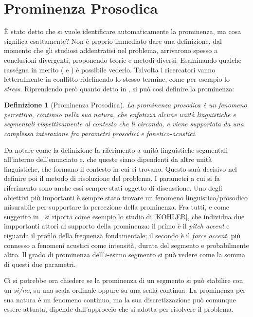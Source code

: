 \documentclass[twoside,twocolumn,11pt]{extarticle}
\theoremstyle{definition}
\begin{document}
\section{Prominenza Prosodica}\label{sec:prom}
	È stato detto che si vuole identificare automaticamente la prominenza, ma cosa significa esattamente? Non è proprio immediato dare una definizione, dal momento che gli studiosi addentratisi nel problema, arrivarono spesso a conclusioni divergenti, proponendo teorie e metodi diversi. Esaminando qualche rasségna in merito (\cite[Capitolo 1]{bib:fenomeni-prosodici-prominenza} e \cite{bib:prominence-by-acoustic-analyses}) è possibile vederlo. Talvolta i ricercatori vanno letteralmente in conflitto ridefinendo lo stesso termine, come per esempio lo \textit{stress}. Riprendendo però quanto detto in \cite{bib:prominence-by-acoustic-analyses}, si può così definire la prominenza:
	\theoremstyle{plain}
	\newtheorem{definition}{Definizione}
	\begin{definition}[Prominenza Prosodica]\label{def:prosodic-prominency}
		La prominenza prosodica è un fenomeno percettivo, continuo nella sua natura, che enfatizza alcune unità linguistiche e segmentali rispettivamente al contesto che li circonda, e viene supportata da una complessa interazione fra parametri prosodici e fonetico-acustici.
	\end{definition}
	Da notare come la definizione fa riferimento a unità linguistiche segmentali all'interno dell'enunciato e, che queste siano dipendenti da altre unità linguistiche, che formano il contesto in cui si trovano. Questo sarà decisivo nel definire poi il metodo di risoluzione del problema. I parametri a cui si fa riferimento sono anche essi sempre stati oggetto di discussione. Uno degli obiettivi più importanti è sempre stato trovare un fenomeno linguistico/prosodico misurabile per supportare la percezione della prominenza. Fra tutti, e come suggerito in \cite{bib:prominence-by-acoustic-analyses}, si riporta come esempio lo studio di [KOHLER], che individua due impportanti attori al supporto della prominenza: il primo è il \textit{pitch accent} e riguarda il profilo della frequenza fondamentale; il secondo è il \textit{force accent}, più connesso a fenomeni acustici come intensità, durata del segmento e probabilmente altro. Il grado di prominenza dell'$i$-esimo segmento si può vedere come la somma di questi due parametri.

	Ci si potrebbe ora chiedere se la prominenza di un segmento si può stabilire con un \textit{sì/no}, su una scala ordinale oppure su una scala continua. La prominenza per sua natura è un fenomeno continuo, ma la sua discretizzazione può comunque essere attuata, dipende dall'approccio che si adotta per risolvere il problema.
	
\end{document}
